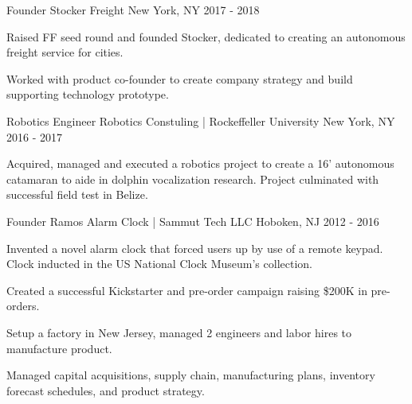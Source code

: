 

\begin{cventries}

  \cventry
    {Founder} %
    {Stocker Freight} %
    {New York, NY} %
    {2017 - 2018} %
    {
      \begin{cvitems} %
        \item {Raised FF seed round and founded Stocker, dedicated to creating
            an autonomous freight service for cities. } 
        \item {Worked with product co-founder to create company strategy and
            build supporting technology prototype.} 
      \end{cvitems}
    }

  \cventry
    {Robotics Engineer} %
    {Robotics Constuling | Rockeffeller University} %
    {New York, NY} %
    {2016 - 2017} %
    {
      \begin{cvitems} %
        \item {Acquired, managed and executed a robotics project to create a 16’
        autonomous catamaran to aide in dolphin vocalization research. Project
        culminated with successful field test in Belize.} 
      \end{cvitems}
    }

  \cventry
    {Founder} %
    {Ramos Alarm Clock | Sammut Tech LLC} %
    {Hoboken, NJ} %
    {2012 - 2016} %
    {
      \begin{cvitems} %
        \item {Invented a novel alarm clock that forced users up by use of a 
            remote keypad. Clock inducted in the US National Clock Museum's collection.} 
        \item {Created a successful Kickstarter and
            pre-order campaign raising \$200K in pre-orders.}
        \item {Setup a factory in New Jersey, managed 2 engineers and labor
            hires to manufacture product.}
        \item {Managed capital acquisitions, supply chain, manufacturing plans, inventory
            forecast schedules, and product strategy.}
      \end{cvitems}
    }


\end{cventries}
